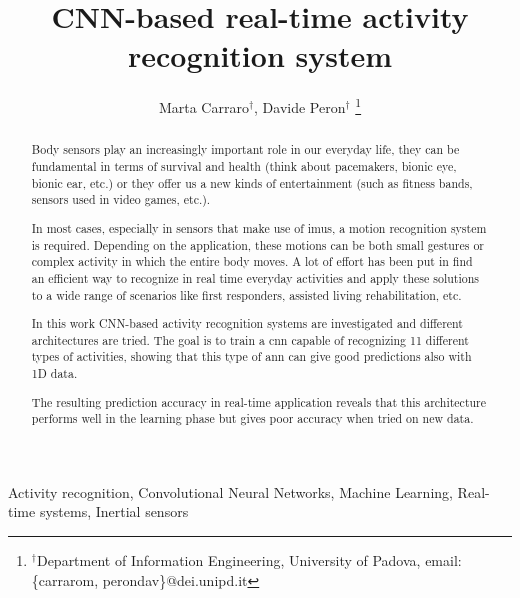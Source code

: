 \documentclass[10pt, conference, letterpaper]{IEEEtran}
\title{CNN-based real-time activity recognition system}
\author{Marta Carraro$^\dag$, Davide Peron$^\dag$
\thanks{$^\dag$Department of Information Engineering, University of Padova, email: \{carrarom, perondav\}@dei.unipd.it}
}
\begin{document}
\maketitle

\begin{abstract}
Body sensors play an increasingly important role in our everyday life, they can be fundamental in terms of survival and health (think about pacemakers, bionic eye, bionic ear, etc.) or they offer us a new kinds of entertainment (such as fitness bands, sensors used in video games, etc.).

In most cases, especially in sensors that make use of \glspl{imu}, a motion recognition system is required. Depending on the application, these motions can be both small gestures or complex activity in which the entire body moves.
A lot of effort has been put in find an efficient way to recognize in real time everyday activities and apply these solutions to a wide range of scenarios like first responders, assisted living rehabilitation, etc.

In this work CNN-based activity recognition systems are investigated and different architectures are tried. The goal is to train a \gls{cnn} capable of recognizing 11 different types of activities, showing that this type of \gls{ann} can give good predictions also with 1D data.

The resulting prediction accuracy in real-time application reveals that this architecture performs well in the learning phase but gives poor accuracy when tried on new data.
\end{abstract}

\IEEEkeywords
Activity recognition, Convolutional Neural Networks, Machine Learning, Real-time systems, Inertial sensors
\endIEEEkeywords









{}



\end{document}
